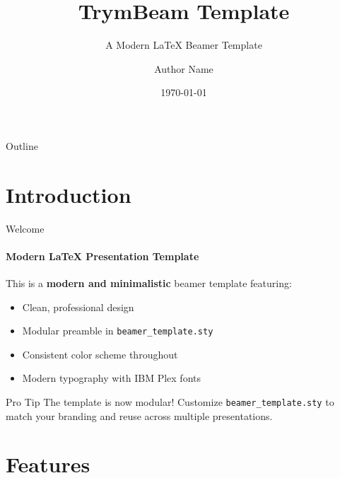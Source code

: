 \documentclass[aspectratio=169]{beamer}
\title{TrymBeam Template}
\subtitle{A Modern LaTeX Beamer Template}
\author{Author Name}
\date{\today}
\institute{Fancy University}
\begin{document}
\begin{frame}[plain]
    \titlepage
\end{frame}

\begin{frame}{Outline}
    \tableofcontents
\end{frame}


\section{Introduction}

\begin{frame}{Welcome}
    \framesubtitle{Modern LaTeX Presentation Template}
    
    This is a \textbf{modern and minimalistic} beamer template featuring:
    
    \begin{itemize}
        \item Clean, professional design
        \item Modular preamble in \texttt{beamer\_template.sty}
        \item Consistent color scheme throughout
        \item Modern typography with IBM Plex fonts
    \end{itemize}
    
    \vspace{1em}
    
    \begin{tipblock}{Pro Tip}
        The template is now modular! Customize \texttt{beamer\_template.sty} to match your branding and reuse across multiple presentations.
    \end{tipblock}
\end{frame}

\section{Features}
\end{document}

